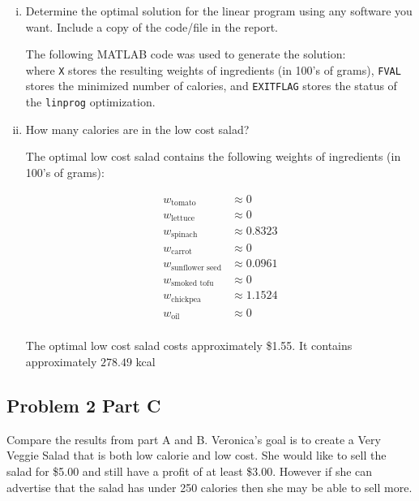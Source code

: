 \documentclass[../main.tex]{subfiles}
\begin{document}
\begin{enumerate}[i.]
	\item Determine the optimal solution for the linear program using any software you want. Include a copy of the code/file in the report.

	The following MATLAB code was used to generate the solution: \\

	

	where \verb|X| stores the resulting weights of ingredients (in 100's of grams), \verb|FVAL| stores the minimized number of calories, and \verb|EXITFLAG| stores the status of the \verb|linprog| optimization.

	\item How many calories are in the low cost salad?

	The optimal low cost salad contains the following weights of ingredients (in 100's of grams):

	\begin{equation*}
		\begin{aligned}
			w_{\text{tomato}} &\approx 0 \\
			w_{\text{lettuce}} &\approx 0 \\
			w_{\text{spinach}} &\approx 0.8323 \\
			w_{\text{carrot}} &\approx 0 \\
			w_{\text{sunflower seed}} &\approx 0.0961 \\
			w_{\text{smoked tofu}} &\approx 0 \\
			w_{\text{chickpea}} &\approx 1.1524 \\
			w_{\text{oil}} &\approx 0 \\
		\end{aligned}
	\end{equation*}

	The optimal low cost salad costs approximately \$1.55. It contains approximately $278.49$ kcal


\end{enumerate}
\newpage

\subsection*{Problem 2 Part C}
Compare the results from part A and B. Veronica’s goal is to create a Very Veggie Salad that is both low calorie and low cost. She would like to sell the salad for \$5.00 and still have a profit of at least \$3.00. However if she can advertise that the salad has under 250 calories then she may be able to sell more.
\end{document}
